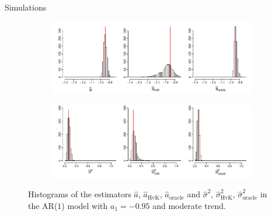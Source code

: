 \documentclass[10pt, handout]{beamer}
\begin{document}
\begin{frame}{Simulations}


\begin{figure}[t!]
\centering
\begin{subfigure}[b]{0.8\textwidth}
\includegraphics[width=\textwidth]{a_hat_histograms_a1=-95_T=500_slope=1_(q,r,M1,M2)=(25,10,20,30).pdf}
\end{subfigure}
\begin{subfigure}[b]{0.8\textwidth}
\includegraphics[width=\textwidth]{lrv_histograms_a1=-95_T=500_slope=1_(q,r,M1,M2)=(25,10,20,30).pdf}
\end{subfigure}
\caption{Histograms of the estimators $\widehat{a}$, $\widehat{a}_{\text{HvK}}$, $\widehat{a}_{\text{oracle}}$ and $\widehat{\sigma}^2$, $\widehat{\sigma}^2_{\text{HvK}}$, $\widehat{\sigma}^2_{\text{oracle}}$ in the AR($1$) model with $a_1 = -0.95$ and moderate trend.}\label{fig:hist_scenario1} 
\end{figure}
\end{frame}
\end{document}
